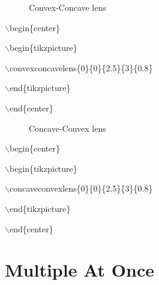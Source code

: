 \documentclass[12pt]{article}
\begin{document}
\begin{minipage}{\textwidth}
\begin{minipage}{0.5\textwidth}

\begin{figure}[H]

\begin{center}


\end{center}

\caption{Convex-Concave lens}
\end{figure}

$\backslash$begin\{center\}

$\backslash$begin\{tikzpicture\}

$\backslash$convexconcavelens\{0\}\{0\}\{2.5\}\{3\}\{0.8\}

$\backslash$end\{tikzpicture\}

$\backslash$end\{center\}
\end{minipage}
\begin{minipage}{0.5\textwidth}

\begin{figure}[H]

\begin{center}


\end{center}

\caption{Concave-Convex lens}
\end{figure}

$\backslash$begin\{center\}

$\backslash$begin\{tikzpicture\}

$\backslash$concaveconvexlens\{0\}\{0\}\{2.5\}\{3\}\{0.8\}

$\backslash$end\{tikzpicture\}

$\backslash$end\{center\}
\end{minipage}
\end{minipage}

\section{Multiple At Once}
\end{document}
